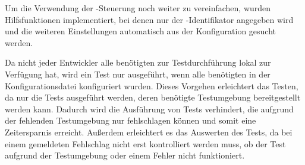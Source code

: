 Um die Verwendung der -Steuerung noch weiter zu vereinfachen, wurden
Hilfsfunktionen implementiert, bei denen nur der -Identifikator 
angegeben wird und die weiteren Einstellungen automatisch aus der Konfiguration 
gesucht werden.

Da nicht jeder Entwickler alle benötigten  zur Testdurchführung
lokal zur Verfügung hat, wird ein Test nur ausgeführt, wenn alle benötigten
 in der Konfigurationsdatei konfiguriert wurden. Dieses Vorgehen
erleichtert das Testen, da nur die Tests ausgeführt werden, deren
benötigte Testumgebung bereitgestellt werden kann. Dadurch wird die
Ausführung von Tests verhindert, die aufgrund der fehlenden Testumgebung
nur fehlschlagen können und somit eine Zeitersparnis erreicht. Außerdem
erleichtert es das Auswerten des Tests, da bei einem gemeldeten Fehlschlag
nicht erst kontrolliert werden muss, ob der Test aufgrund der Testumgebung
oder einem Fehler nicht funktioniert.

